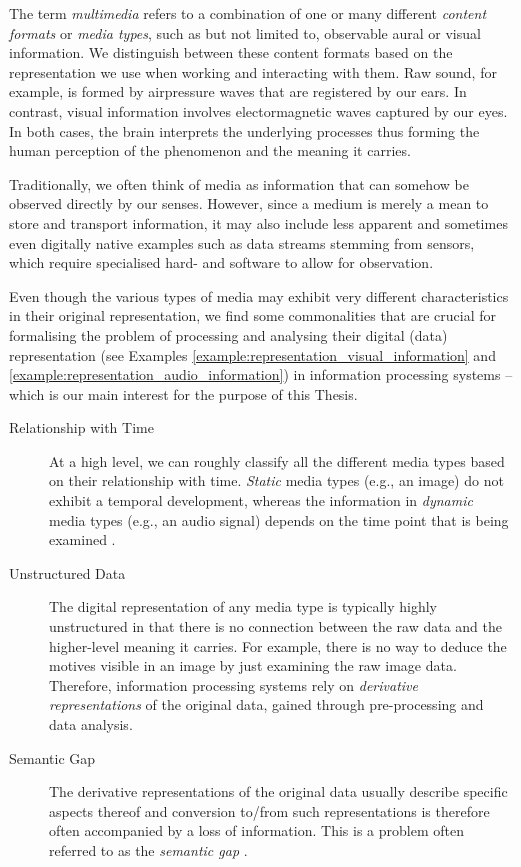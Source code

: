The term \emph{multimedia} refers to a combination of one or many different \emph{content formats} or \emph{media types}, such as but not limited to, observable aural or visual information. We distinguish between these content formats based on the representation we use when working and interacting with them. Raw sound, for example, is formed by airpressure waves that are registered by our ears. In contrast, visual information involves electormagnetic waves captured by our eyes. In both cases, the brain interprets the underlying processes thus forming the human perception of the phenomenon and the meaning it carries.

Traditionally, we often think of media as information that can somehow be observed directly by our senses. However, since a medium is merely a mean to store and transport information, it may also include less apparent and sometimes even digitally native examples such as data streams stemming from sensors, which require specialised hard- and software to allow for observation.

Even though the various types of media may exhibit very different characteristics in their original representation, we find some commonalities that are crucial for formalising the problem of processing and analysing their digital (data) representation (see Examples \ref{example:representation_visual_information} and \ref{example:representation_audio_information}) in information processing systems -- which is our main interest for the purpose of this Thesis.

\begin{description}
    \item[Relationship with Time] At a high level, we can roughly classify all the different media types based on their relationship with time. \emph{Static} media types (e.g., an image) do not exhibit a temporal development, whereas the information in \emph{dynamic} media types (e.g., an audio signal) depends on the time point that is being examined \cite{Blanken:2007multimedia}.

    \item[Unstructured Data] The digital representation of any media type is typically highly unstructured in that there is no connection between the raw data and the higher-level meaning it carries. For example, there is no way to deduce the motives visible in an image by just examining the raw image data. Therefore, information processing systems rely on \emph{derivative representations} of the original data, gained through pre-processing and data analysis.
    
    \item[Semantic Gap] The derivative representations of the original data usually describe specific aspects thereof and conversion to/from such representations is therefore often accompanied by a loss of information. This is a problem often referred to as the \emph{semantic gap} \cite{Blanken:2007multimedia, Rossetto:2018Multi}.
\end{description}

